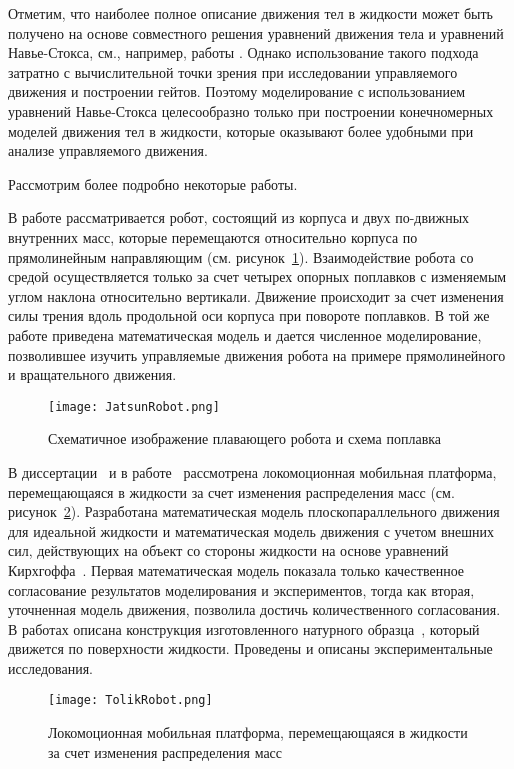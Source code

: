 Отметим, что наиболее полное описание движения тел в жидкости может быть получено на основе совместного решения уравнений движения тела и уравнений Навье-Стокса, см., например, работы \cite{Childress_et_al_2011, Eldredge_2006, Vetchanin_et_al_2013}. Однако использование такого подхода затратно с вычислительной точки зрения при исследовании управляемого движения и построении гейтов. Поэтому моделирование с использованием уравнений Навье-Стокса целесообразно только при построении конечномерных моделей движения тел в жидкости, которые оказывают более удобными при анализе управляемого движения.

Рассмотрим более подробно некоторые работы.

В работе \cite{Volkova_Jatsun} рассматривается робот, состоящий из корпуса и двух по-движных внутренних масс, которые перемещаются относительно корпуса по прямолинейным направляющим (см. рисунок~\ref{JatsunRobot}). Взаимодействие робота со средой осуществляется только за счет четырех опорных поплавков с изменяемым углом наклона относительно вертикали. Движение происходит за счет изменения силы трения вдоль продольной оси корпуса при повороте поплавков. В той же работе приведена математическая модель и дается численное моделирование, позволившее изучить управляемые движения робота на примере прямолинейного и вращательного движения.

\begin{figure}[h]
	\centering
	\texttt{[image: JatsunRobot.png]}%
	\caption{Схематичное изображение плавающего робота и схема поплавка}
	\label{JatsunRobot}
\end{figure}

В диссертации~\cite{Klenov_diss} и в работе~\cite{Klenov_Kilin_2016} рассмотрена локомоционная мобильная платформа, перемещающаяся в жидкости за счет изменения распределения масс (см. рисунок~\ref{TolikRobot}). Разработана математическая модель плоскопараллельного движения для идеальной жидкости и математическая модель движения с учетом внешних сил, действующих на объект со стороны жидкости на основе уравнений Кирхгоффа~\cite{Kirchhoff}. Первая математическая модель показала только качественное согласование результатов моделирования и экспериментов, тогда как вторая, уточненная модель движения, позволила достичь количественного согласования. В работах описана конструкция изготовленного натурного образца~\cite{patent_BNR}, который движется по поверхности жидкости. Проведены и описаны экспериментальные исследования. 

\begin{figure}[h]
	\centering
	\texttt{[image: TolikRobot.png]}%
	\caption{Локомоционная мобильная платформа, перемещающаяся в жидкости за счет изменения распределения масс}
	\label{TolikRobot}
\end{figure}

